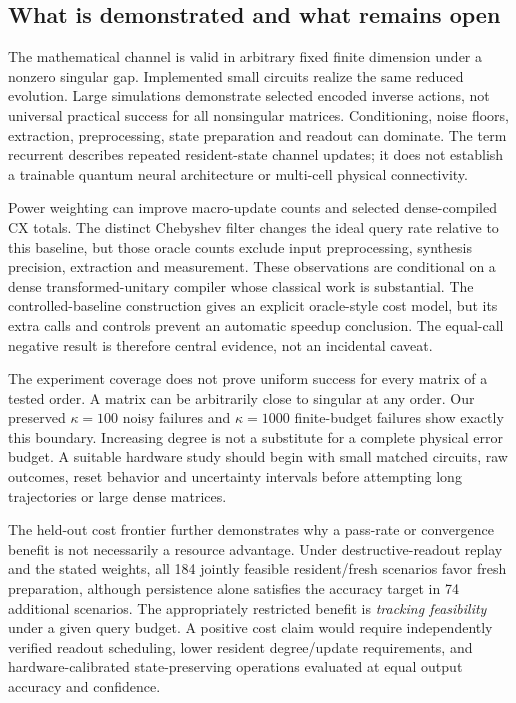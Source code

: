 \documentclass{ieeeaccess}
\begin{document}
\subsection{What is demonstrated and what remains open}
The mathematical channel is valid in arbitrary fixed finite dimension under a nonzero singular gap. Implemented small circuits realize the same reduced evolution. Large simulations demonstrate selected encoded inverse actions, not universal practical success for all nonsingular matrices. Conditioning, noise floors, extraction, preprocessing, state preparation and readout can dominate. The term recurrent describes repeated resident-state channel updates; it does not establish a trainable quantum neural architecture or multi-cell physical connectivity.

Power weighting can improve macro-update counts and selected dense-compiled CX totals. The distinct Chebyshev filter changes the ideal query rate relative to this baseline, but those oracle counts exclude input preprocessing, synthesis precision, extraction and measurement. These observations are conditional on a dense transformed-unitary compiler whose classical work is substantial. The controlled-baseline construction gives an explicit oracle-style cost model, but its extra calls and controls prevent an automatic speedup conclusion. The equal-call negative result is therefore central evidence, not an incidental caveat.

The experiment coverage does not prove uniform success for every matrix of a tested order. A matrix can be arbitrarily close to singular at any order. Our preserved $\kappa=100$ noisy failures and $\kappa=1000$ finite-budget failures show exactly this boundary. Increasing degree is not a substitute for a complete physical error budget. A suitable hardware study should begin with small matched circuits, raw outcomes, reset behavior and uncertainty intervals before attempting long trajectories or large dense matrices.




The held-out cost frontier further demonstrates why a pass-rate or convergence benefit is not necessarily a resource advantage. Under destructive-readout replay and the stated weights, all 184 jointly feasible resident/fresh scenarios favor fresh preparation, although persistence alone satisfies the accuracy target in 74 additional scenarios. The appropriately restricted benefit is \emph{tracking feasibility} under a given query budget. A positive cost claim would require independently verified readout scheduling, lower resident degree/update requirements, and hardware-calibrated state-preserving operations evaluated at equal output accuracy and confidence.
\end{document}
